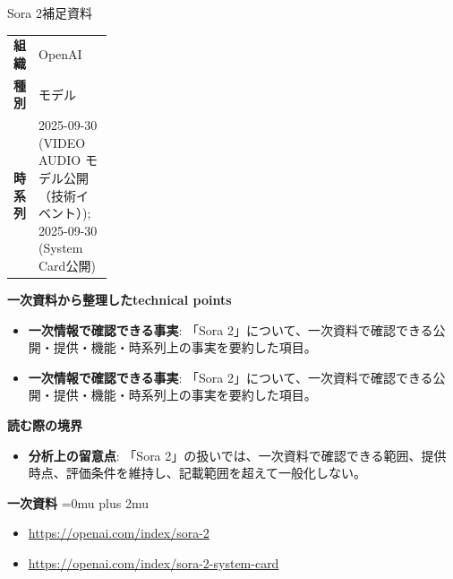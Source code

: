 \begin{technicalnote}{Sora 2}{補足資料}
\begingroup
\begin{tabularx}{\linewidth}{@{}>{\bfseries}p{0.22\linewidth}X@{}}
組織 & OpenAI \\
種別 & モデル \\
時系列 & 2025-09-30 (VIDEO AUDIO モデル公開（技術イベント）); 2025-09-30 (System Card公開) \\
\end{tabularx}
\smallskip
{\bfseries 一次資料から整理したtechnical points}
\begin{itemize}[leftmargin=1.5em,itemsep=0.35em]
\item \textbf{一次情報で確認できる事実}: 「Sora 2」について、一次資料で確認できる公開・提供・機能・時系列上の事実を要約した項目。
\item \textbf{一次情報で確認できる事実}: 「Sora 2」について、一次資料で確認できる公開・提供・機能・時系列上の事実を要約した項目。
\end{itemize}
\begin{minipage}{\linewidth}
{\bfseries 読む際の境界}
\begin{itemize}[leftmargin=1.5em,itemsep=0.35em]
\item \textbf{分析上の留意点}: 「Sora 2」の扱いでは、一次資料で確認できる範囲、提供時点、評価条件を維持し、記載範囲を超えて一般化しない。
\end{itemize}
\begin{samepage}
{\bfseries 一次資料}
\begingroup\sloppy
\Urlmuskip=0mu plus 2mu\relax
\begin{itemize}[leftmargin=1.5em,itemsep=0.25em]
\item {\scriptsize\url{https://openai.com/index/sora-2}}
\item {\scriptsize\url{https://openai.com/index/sora-2-system-card}}
\end{itemize}
\endgroup
\end{samepage}
\end{minipage}
\endgroup
\end{technicalnote}
\medskip


